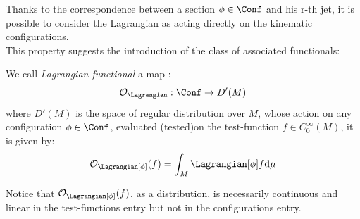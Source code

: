\documentclass[Main]{subfiles}
\begin{document}
	
	Thanks to the correspondence between a section $\phi \in \Conf$ and his r-th jet, it is possible to consider the Lagrangian as acting directly on the kinematic configurations.
	\\
	This property suggests the introduction of the class of associated functionals:
	\begin{definition}\label{Def:LagrangianFunctionals}
		We call \emph{Lagrangian functional} a map :
		\begin{displaymath}
			\mathcal{O}_\Lagrangian : \Conf \rightarrow D'(M) 
		\end{displaymath}			
		where  $D'(M)$ is the space of regular distribution over $M$, %
		whose action on any configuration $\phi \in \Conf$, evaluated \ifToninus (tested)\fi on the test-function $f \in C^\infty_0(M)$, it is given by:
		\begin{displaymath}
			\mathcal{O}_\Lagrangian [\phi] (f) = \int_M \Lagrangian [\phi] f \textrm{d}\mu
		\end{displaymath}		
	\end{definition}	
	Notice that $\mathcal{O}_\Lagrangian [\phi] (f)$, as a distribution, 
	is necessarily continuous and linear in the test-functions entry  but not in the configurations entry.	
	
\end{document}
